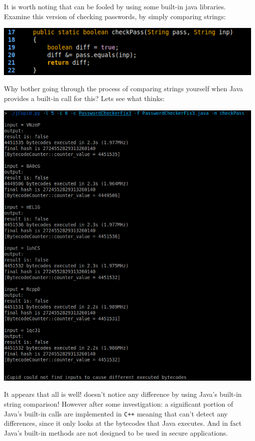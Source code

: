 It is worth noting that \jcupid can be fooled by using some built-in java libraries. Examine this version
of checking passwords, by simply comparing strings:

\begin{center}
  \includegraphics[width=\linewidth]{PasswordCheckerFix3}
\end{center}

Why bother going through the process of comparing strings yourself when Java provides a built-in call for
this? Lets see what \jcupid thinks:

\begin{center}
  \includegraphics[width=\linewidth]{jCupidRun4}
\end{center}

It appears that all is well! \jcupid doesn't notice any difference by using Java's built-in string comparison!
However after some investigation: a significant portion of Java's built-in calls are implemented in \texttt{C++}
meaning that \jcupid can't detect any differences, since it only looks at the bytecodes that Java executes. And
in fact Java's built-in methods are not designed to be used in secure applications.

